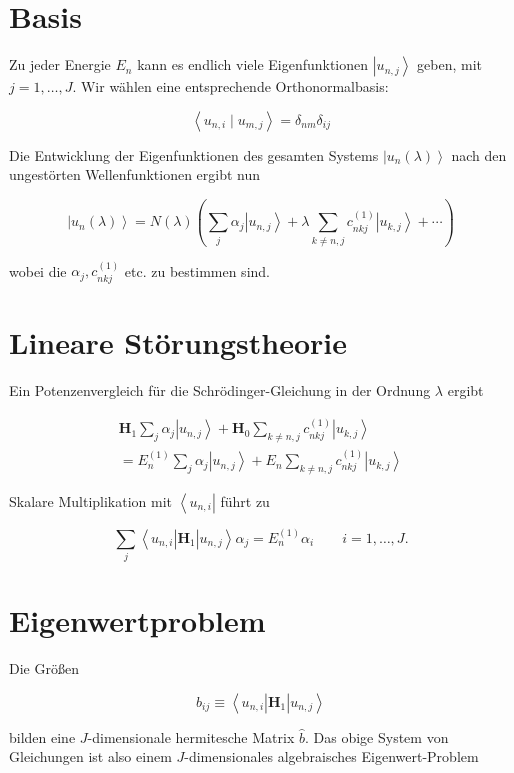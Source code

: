 \documentclass[10pt, letterpaper]{article}
\begin{document}
\section*{Basis}
Zu jeder Energie $E_{n}$ kann es endlich viele Eigenfunktionen $\left|u_{n, j}\right\rangle$ geben, mit $j=1, \ldots, J$. Wir wählen eine entsprechende Orthonormalbasis:

$$
\left\langle u_{n, i} \mid u_{m, j}\right\rangle=\delta_{n m} \delta_{i j}
$$

Die Entwicklung der Eigenfunktionen des gesamten Systems $\left|u_{n}(\lambda)\right\rangle$ nach den ungestörten Wellenfunktionen ergibt nun

$$
\left|u_{n}(\lambda)\right\rangle=N(\lambda)\left(\sum_{j} \alpha_{j}\left|u_{n, j}\right\rangle+\lambda \sum_{k \neq n, j} c_{n k j}^{(1)}\left|u_{k, j}\right\rangle+\cdots\right)
$$

wobei die $\alpha_{j}, c_{n k j}^{(1)}$ etc. zu bestimmen sind.

\section*{Lineare Störungstheorie}
Ein Potenzenvergleich für die Schrödinger-Gleichung in der Ordnung $\lambda$ ergibt

$$
\begin{array}{r}
\mathbf{H}_{1} \sum_{j} \alpha_{j}\left|u_{n, j}\right\rangle+\mathbf{H}_{0} \sum_{k \neq n, j} c_{n k j}^{(1)}\left|u_{k, j}\right\rangle \\
=E_{n}^{(1)} \sum_{j} \alpha_{j}\left|u_{n, j}\right\rangle+E_{n} \sum_{k \neq n, j} c_{n k j}^{(1)}\left|u_{k, j}\right\rangle
\end{array}
$$

Skalare Multiplikation mit $\left\langle u_{n, i}\right|$ führt zu

$$
\sum_{j}\left\langle u_{n, i}\right| \mathbf{H}_{1}\left|u_{n, j}\right\rangle \alpha_{j}=E_{n}^{(1)} \alpha_{i} \quad \quad i=1, \ldots, J .
$$

\section*{Eigenwertproblem}
Die Größen

$$
b_{i j} \equiv\left\langle u_{n, i}\right| \mathbf{H}_{1}\left|u_{n, j}\right\rangle
$$

bilden eine $J$-dimensionale hermitesche Matrix $\hat{b}$. Das obige System von Gleichungen ist also einem $J$-dimensionales algebraisches Eigenwert-Problem
\end{document}
